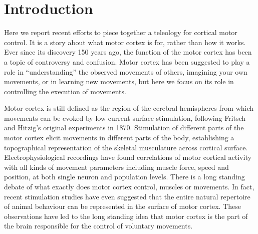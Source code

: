 \section{Introduction}

Here we report recent efforts to piece together a teleology for cortical motor control. It is a story about what motor cortex is for, rather than how it works. Ever since its discovery 150 years ago, the function of the motor cortex has been a topic of controversy and confusion. Motor cortex has been suggested to play a role in ``understanding'' the observed movements of others, imagining your own movements, or in learning new movements, but here we focus on its role in controlling the execution of movements.

Motor cortex is still defined as the region of the cerebral hemispheres from which movements can be evoked by low-current surface stimulation, following Fritsch and Hitzig's original experiments in 1870. Stimulation of different parts of the motor cortex elicit movements in different parts of the body, establishing a topographical representation of the skeletal musculature across cortical surface. Electrophysiological recordings have found correlations of motor cortical activity with all kinds of movement parameters including muscle force, speed and position, at both single neuron and population levels. There is a long standing debate of what exactly does motor cortex control, muscles or movements. In fact, recent stimulation studies have even suggested that the entire natural repertoire of animal behaviour can be represented in the surface of motor cortex. These observations have led to the long standing idea that motor cortex is the part of the brain responsible for the control of voluntary movements.

